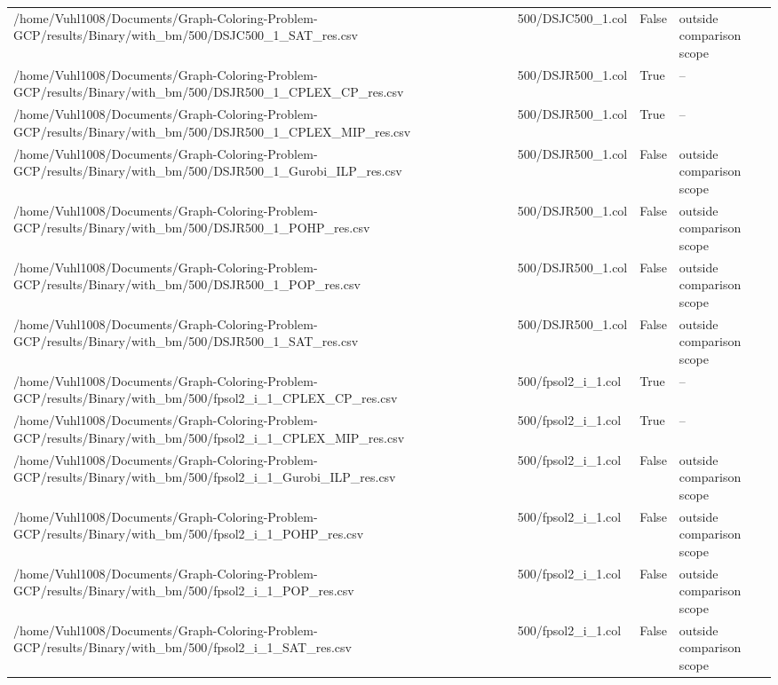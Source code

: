 \begin{table}[htbp]
\begin{tabular}{llll}
/home/Vuhl1008/Documents/Graph-Coloring-Problem-GCP/results/Binary/with\_bm/500/DSJC500\_1\_SAT\_res.csv & 500/DSJC500\_1.col & False & outside comparison scope \\
/home/Vuhl1008/Documents/Graph-Coloring-Problem-GCP/results/Binary/with\_bm/500/DSJR500\_1\_CPLEX\_CP\_res.csv & 500/DSJR500\_1.col & True & -- \\
/home/Vuhl1008/Documents/Graph-Coloring-Problem-GCP/results/Binary/with\_bm/500/DSJR500\_1\_CPLEX\_MIP\_res.csv & 500/DSJR500\_1.col & True & -- \\
/home/Vuhl1008/Documents/Graph-Coloring-Problem-GCP/results/Binary/with\_bm/500/DSJR500\_1\_Gurobi\_ILP\_res.csv & 500/DSJR500\_1.col & False & outside comparison scope \\
/home/Vuhl1008/Documents/Graph-Coloring-Problem-GCP/results/Binary/with\_bm/500/DSJR500\_1\_POHP\_res.csv & 500/DSJR500\_1.col & False & outside comparison scope \\
/home/Vuhl1008/Documents/Graph-Coloring-Problem-GCP/results/Binary/with\_bm/500/DSJR500\_1\_POP\_res.csv & 500/DSJR500\_1.col & False & outside comparison scope \\
/home/Vuhl1008/Documents/Graph-Coloring-Problem-GCP/results/Binary/with\_bm/500/DSJR500\_1\_SAT\_res.csv & 500/DSJR500\_1.col & False & outside comparison scope \\
/home/Vuhl1008/Documents/Graph-Coloring-Problem-GCP/results/Binary/with\_bm/500/fpsol2\_i\_1\_CPLEX\_CP\_res.csv & 500/fpsol2\_i\_1.col & True & -- \\
/home/Vuhl1008/Documents/Graph-Coloring-Problem-GCP/results/Binary/with\_bm/500/fpsol2\_i\_1\_CPLEX\_MIP\_res.csv & 500/fpsol2\_i\_1.col & True & -- \\
/home/Vuhl1008/Documents/Graph-Coloring-Problem-GCP/results/Binary/with\_bm/500/fpsol2\_i\_1\_Gurobi\_ILP\_res.csv & 500/fpsol2\_i\_1.col & False & outside comparison scope \\
/home/Vuhl1008/Documents/Graph-Coloring-Problem-GCP/results/Binary/with\_bm/500/fpsol2\_i\_1\_POHP\_res.csv & 500/fpsol2\_i\_1.col & False & outside comparison scope \\
/home/Vuhl1008/Documents/Graph-Coloring-Problem-GCP/results/Binary/with\_bm/500/fpsol2\_i\_1\_POP\_res.csv & 500/fpsol2\_i\_1.col & False & outside comparison scope \\
/home/Vuhl1008/Documents/Graph-Coloring-Problem-GCP/results/Binary/with\_bm/500/fpsol2\_i\_1\_SAT\_res.csv & 500/fpsol2\_i\_1.col & False & outside comparison scope \\

\end{tabular}
\end{table}
